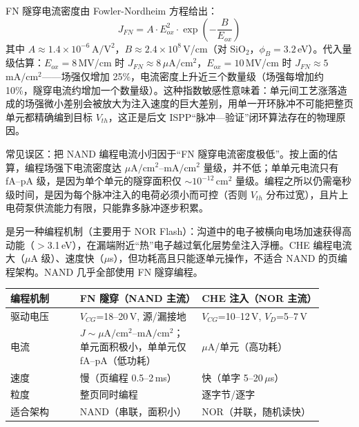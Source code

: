 FN 隧穿电流密度由 Fowler-Nordheim 方程给出：
$$J_{FN} = A \cdot E_{ox}^2 \cdot \exp\!\left(-\frac{B}{E_{ox}}\right)$$
其中 $A \approx 1.4 \times 10^{-6}$\,$\mathrm{A/V^2}$，$B \approx 2.4 \times 10^{8}$\,V/cm（对 SiO$_2$，$\phi_B = 3.2$\,eV）。代入量级估算：$E_{ox} = 8$\,MV/cm 时 $J_{FN} \approx 8$\,$\mu\mathrm{A/cm^2}$，$E_{ox} = 10$\,MV/cm 时 $J_{FN} \approx 5$\,$\mathrm{mA/cm^2}$——场强仅增加 25\%，电流密度上升近三个数量级（场强每增加约 10\%，隧穿电流约增加一个数量级）。这种指数敏感性意味着：单元间工艺涨落造成的场强微小差别会被放大为注入速度的巨大差别，用单一开环脉冲不可能把整页单元都精确编到目标 $V_{th}$，这正是后文 ISPP“脉冲—验证”闭环算法存在的物理原因。

\begin{warningbox}
常见误区：把 NAND 编程电流小归因于“FN 隧穿电流密度极低”。按上面的估算，编程场强下电流密度达 $\mu\mathrm{A/cm^2}$--$\mathrm{mA/cm^2}$ 量级，并不低；单单元电流只有 fA--pA 级，是因为单个单元的隧穿面积仅 $\sim$$10^{-12}$\,$\mathrm{cm^2}$ 量级。编程之所以仍需毫秒级时间，是因为每个脉冲注入的电荷必须小而可控（否则 $V_{th}$ 分布过宽），且片上电荷泵供流能力有限，只能靠多脉冲逐步积累。
\end{warningbox}

是另一种编程机制（主要用于 NOR Flash）：沟道中的电子被横向电场加速获得高动能（$>$3.1\,eV），在漏端附近“热”电子越过氧化层势垒注入浮栅。CHE 编程电流大（$\mu$A 级）、速度快（$\mu$s），但功耗高且只能逐单元操作，不适合 NAND 的页编程架构。NAND 几乎全部使用 FN 隧穿编程。

\begin{longtable}{L{0.2\linewidth}L{0.35\linewidth}L{0.35\linewidth}}
\toprule
编程机制 & FN 隧穿（NAND 主流） & CHE 注入（NOR 主流） \\
\midrule
驱动电压 & $V_{CG}$=18--20\,V, 源/漏接地 & $V_{CG}$=10--12\,V, $V_D$=5--7\,V \\\tablerowrule
电流 & $J \sim \mu\mathrm{A/cm^2}$--$\mathrm{mA/cm^2}$；单元面积极小，单单元仅 fA--pA（低功耗） & $\mu$A/单元（高功耗） \\\tablerowrule
速度 & 慢（页编程 0.5--2\,ms） & 快（单字 5--20\,$\mu$s） \\\tablerowrule
粒度 & 整页同时编程 & 逐字节/逐字 \\\tablerowrule
适合架构 & NAND（串联，面积小） & NOR（并联，随机读快） \\
\bottomrule
\end{longtable}


